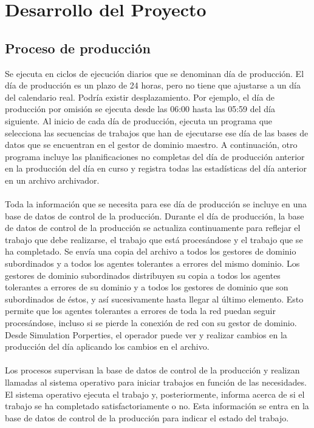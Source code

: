 \documentclass[10pt]{article}   			%
\begin{document}
\newpage		
\section{Desarrollo del Proyecto}

\subsection{Proceso de producción}

Se ejecuta en ciclos de ejecución diarios que se denominan día de producción. El día de producción es un plazo de 24 horas, pero no tiene que ajustarse a un día del calendario real. Podría existir desplazamiento. Por ejemplo, el día de producción por omisión se ejecuta desde las 06:00 hasta las 05:59 del día siguiente. Al inicio de cada día de producción, ejecuta un programa que selecciona las secuencias de trabajos que han de ejecutarse ese día de las bases de datos que se encuentran en el gestor de dominio maestro. A continuación, otro programa incluye las planificaciones no completas del día de producción anterior en la producción del día en curso y registra todas las estadísticas del día anterior en un archivo archivador.\\ \\
Toda la información que se necesita para ese día de producción se incluye en una base de datos de control de la producción. Durante el día de producción, la base de datos de control de la producción se actualiza continuamente para reflejar el trabajo que debe realizarse, el trabajo que está procesándose y el trabajo que se ha completado. Se envía una copia del archivo a todos los gestores de dominio subordinados y a todos los agentes tolerantes a errores del mismo dominio. Los gestores de dominio subordinados distribuyen su copia a todos los agentes tolerantes a errores de su dominio y a todos los gestores de dominio que son subordinados de éstos, y así sucesivamente hasta llegar al último elemento. Esto permite que los agentes tolerantes a errores de toda la red puedan seguir procesándose, incluso si se pierde la conexión de red con su gestor de dominio. Desde Simulation Porperties, el operador puede ver y realizar cambios en la producción del día aplicando los cambios en el archivo.\\ \\
Los procesos supervisan la base de datos de control de la producción y realizan llamadas al sistema operativo para iniciar trabajos en función de las necesidades. El sistema operativo ejecuta el trabajo y, posteriormente, informa acerca de si el trabajo se ha completado satisfactoriamente o no. Esta información se entra en la base de datos de control de la producción para indicar el estado del trabajo.
\end{document}
